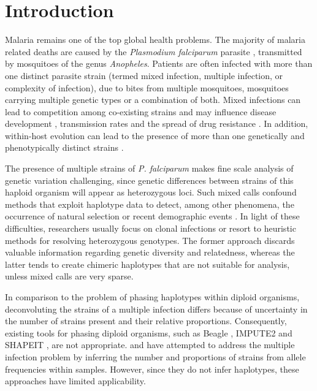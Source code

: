 \documentclass{bioinfo}
\begin{document}
\maketitle

\section{Introduction}
Malaria remains one of the top global health problems. The majority of malaria related deaths are caused by the {\it Plasmodium falciparum} parasite \citep{WHO2016}, transmitted by mosquitoes of the genus {\it Anopheles}. Patients are often infected with more than one distinct parasite strain (termed mixed infection, multiple infection, or complexity of infection), due to bites from multiple mosquitoes, mosquitoes carrying multiple genetic types or a combination of both. Mixed infections  can lead to competition among co-existing strains and may influence disease development \citep{deRoode2005}, transmission rates \citep{Arnot1998} and the spread of drug resistance \citep{deRoode2004}. In addition, within-host evolution can lead to the presence of more than one genetically and phenotypically distinct strains \citep{Bell2006}.

The presence of multiple strains of {\it P. falciparum} makes fine scale analysis of genetic variation challenging, since genetic differences between strains of this haploid organism will appear as heterozygous loci. Such mixed calls confound methods that exploit haplotype data to detect, among other phenomena, the occurrence of natural selection or recent demographic events \citep{Harris2013, Lawson2012, Mathieson2014, Sabeti2002}. In light of these difficulties, researchers usually focus on clonal infections or resort to heuristic methods for resolving heterozygous genotypes. The former approach discards valuable information regarding genetic diversity and relatedness, whereas the latter tends to create chimeric haplotypes that are not suitable for analysis, unless mixed calls are very sparse.

In comparison to the problem of phasing haplotypes within diploid organisms, deconvoluting the strains of a multiple infection differs because of uncertainty in the number of strains present and their relative proportions.  Consequently, existing tools for phasing diploid organisms, such as Beagle \citep{Browning2007}, IMPUTE2 \citep{Howie2009} and SHAPEIT \citep{Delaneau2012, Oconnell2014}, are not appropriate. \citet{Galinsky2015} and \citet{Jack2016} have attempted to address the multiple infection problem by inferring the number and proportions of strains from allele frequencies within samples.  However, since they do not infer haplotypes, these approaches have limited applicability.
\end{document}

